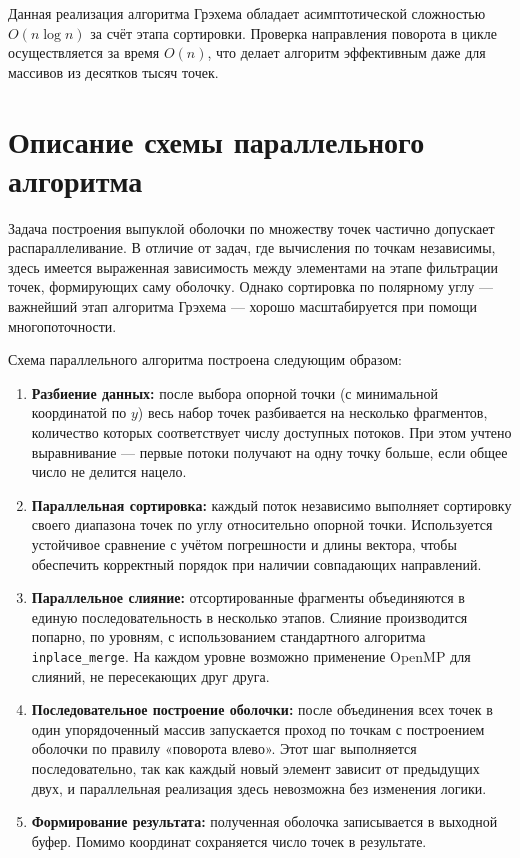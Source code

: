\documentclass[12pt,a4paper]{extarticle}
\begin{document}
Данная реализация алгоритма Грэхема обладает асимптотической сложностью $O(n \log n)$ за счёт этапа сортировки. Проверка направления поворота в цикле осуществляется за время $O(n)$, что делает алгоритм эффективным даже для массивов из десятков тысяч точек.

\section{Описание схемы параллельного алгоритма}

Задача построения выпуклой оболочки по множеству точек частично допускает распараллеливание. В отличие от задач, где вычисления по точкам независимы, здесь имеется выраженная зависимость между элементами на этапе фильтрации точек, формирующих саму оболочку. Однако сортировка по полярному углу — важнейший этап алгоритма Грэхема — хорошо масштабируется при помощи многопоточности.

Схема параллельного алгоритма построена следующим образом:

\begin{enumerate}
    \item \textbf{Разбиение данных:} после выбора опорной точки (с минимальной координатой по $y$) весь набор точек разбивается на несколько фрагментов, количество которых соответствует числу доступных потоков. При этом учтено выравнивание — первые потоки получают на одну точку больше, если общее число не делится нацело.

    \item \textbf{Параллельная сортировка:} каждый поток независимо выполняет сортировку своего диапазона точек по углу относительно опорной точки. Используется устойчивое сравнение с учётом погрешности и длины вектора, чтобы обеспечить корректный порядок при наличии совпадающих направлений.

    \item \textbf{Параллельное слияние:} отсортированные фрагменты объединяются в единую последовательность в несколько этапов. Слияние производится попарно, по уровням, с использованием стандартного алгоритма \texttt{inplace\_merge}. На каждом уровне возможно применение OpenMP для слияний, не пересекающих друг друга.

    \item \textbf{Последовательное построение оболочки:} после объединения всех точек в один упорядоченный массив запускается проход по точкам с построением оболочки по правилу «поворота влево». Этот шаг выполняется последовательно, так как каждый новый элемент зависит от предыдущих двух, и параллельная реализация здесь невозможна без изменения логики.

    \item \textbf{Формирование результата:} полученная оболочка записывается в выходной буфер. Помимо координат сохраняется число точек в результате.
\end{enumerate}
\end{document}
